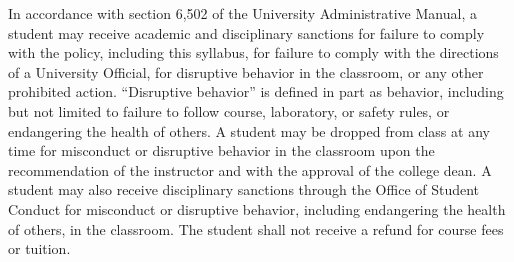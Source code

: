 In accordance with section 6,502 of the University Administrative Manual, a
student may receive academic and disciplinary sanctions for failure to comply
with the policy, including this syllabus, for failure to comply with the
directions of a University Official, for disruptive behavior in the classroom, or
any other prohibited action. ``Disruptive behavior'' is defined in part as
behavior, including but not limited to failure to follow course, laboratory, or
safety rules, or endangering the health of others. A student may be dropped from
class at any time for misconduct or disruptive behavior in the classroom upon the
recommendation of the instructor and with the approval of the college dean. A
student may also receive disciplinary sanctions through the Office of Student
Conduct for misconduct or disruptive behavior, including endangering the health
of others, in the classroom. The student shall not receive a refund for course
fees or tuition.

